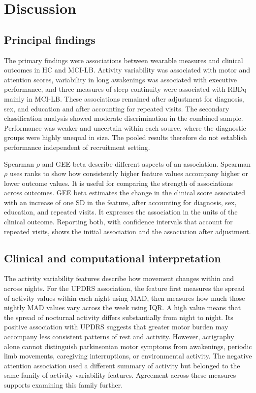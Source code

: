 \documentclass[referee,pdflatex,sn-vancouver-num]{sn-jnl}
\begin{document}
\FloatBarrier
\section{Discussion}\label{sec:discussion}

\subsection{Principal findings}\label{subsec:principal-findings}

The primary findings were associations between wearable measures and clinical
outcomes in HC and MCI-LB. Activity variability was associated with motor and
attention scores, variability in long awakenings was associated with executive
performance, and three measures of sleep continuity were associated with RBDq
mainly in MCI-LB. These associations remained after adjustment for diagnosis,
sex, and education and after accounting for repeated visits. The secondary
classification analysis showed moderate discrimination in the combined sample.
Performance was weaker and uncertain within each source, where the diagnostic
groups were highly unequal in size. The pooled results therefore do not
establish performance independent of recruitment setting.

Spearman $\rho$ and GEE beta describe different aspects of an association.
Spearman $\rho$ uses ranks to show how consistently higher feature values
accompany higher or lower outcome values. It is useful for comparing the
strength of associations across outcomes. GEE beta estimates the change in the
clinical score associated with an increase of one SD in the feature, after
accounting for diagnosis, sex, education, and repeated visits. It expresses the
association in the units of the clinical outcome. Reporting both, with
confidence intervals that account for repeated visits, shows the initial
association and the association after adjustment.

\subsection{Clinical and computational interpretation}\label{subsec:interpretation}

The activity variability features describe how movement changes within and
across nights. For the UPDRS association, the feature first measures the spread
of activity values within each night using MAD, then measures how much those
nightly MAD values vary across the week using IQR. A high value means that the
spread of nocturnal activity differs substantially from night to night.
Its positive association with UPDRS suggests that greater motor burden may
accompany less consistent patterns of rest and activity. However, actigraphy alone cannot distinguish
parkinsonian motor symptoms from awakenings, periodic limb movements,
caregiving interruptions, or environmental activity. The negative attention
association used a different summary of activity but belonged to the same
family of activity variability features. Agreement across these measures
supports examining this family further.
\end{document}
